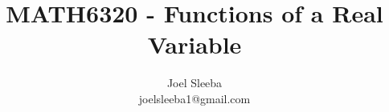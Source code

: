 \documentclass[12pt]{report}
\theoremstyle{plain} %
\theoremstyle{definition} %
\theoremstyle{remark} %
\begin{document}
    \title{MATH6320 - Functions of a Real Variable}


    \author{
      Joel Sleeba \\
      joelsleeba1@gmail.com \\
    }

    \maketitle

     \setcounter{page}{2}
    \tableofcontents
     \setcounter{page}{1}

    
    
    
    
    
    
    
    
    
    
    
    
    


    \printbibliography[heading=bibintoc]
\end{document}
